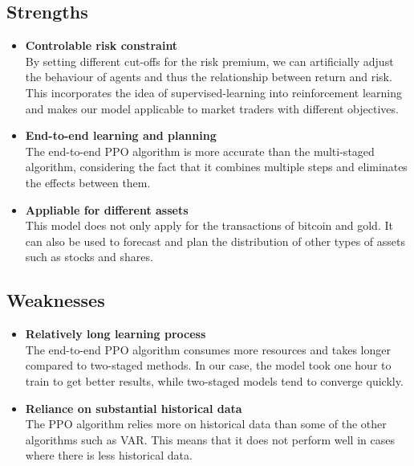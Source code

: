 \documentclass{mcmthesis}
\begin{document}
\subsection{Strengths}
\begin{itemize}
\item \textbf{Controlable risk constraint}\\
By setting different cut-offs for the risk premium, we can artificially adjust the behaviour of agents and thus the relationship between return and risk. This incorporates the idea of supervised-learning into reinforcement learning and makes our model applicable to market traders with different objectives.
\item \textbf{End-to-end learning and planning}\\
The end-to-end PPO algorithm is more accurate than the multi-staged algorithm, considering the fact that it combines multiple steps and eliminates the effects between them.
\item \textbf{Appliable for different assets}\\
This model does not only apply for the transactions of bitcoin and gold.
It can also be used to forecast and plan the distribution of other types of assets such as stocks and shares.
\end{itemize}

\subsection{Weaknesses}
\begin{itemize}
  \item \textbf{Relatively long learning process}\\
  The end-to-end PPO algorithm consumes more resources and takes longer compared to two-staged methods.
  In our case, the model took one hour to train to get better results, while two-staged models tend to converge quickly.
  \item \textbf{Reliance on substantial historical data}\\
  The PPO algorithm relies more on historical data than some of the other algorithms such as VAR. This means that it does not perform well in cases where there is less historical data.
\end{itemize}

\end{document}
